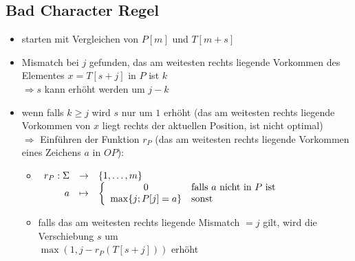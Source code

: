 \subsection{Bad Character Regel}
\vspace*{-0.5\baselineskip}\begin{itemize}[itemsep=-1pt]
	\item starten mit Vergleichen von $P[m]$ und $T[m+s]$
	\item Mismatch bei $j$ gefunden, das am weitesten rechts liegende Vorkommen des Elementes $x=T[s+j]$ in $P$ ist $k$\\
	$\Longrightarrow s$ kann erhöht werden um $j-k$
	\item wenn falls $k\geq j$ wird $s$ nur um $1$ erhöht (das am weitesten rechts liegende Vorkommen von $x$ liegt rechts der aktuellen Position, ist nicht optimal)\\
	$\Rightarrow$ Einführen der Funktion $r_P$ (das am weitesten rechts liegende Vorkommen eines Zeichens $a$ in $OP$):
		\begin{itemize}
			\item $\begin{array}[t]{rcl}
						r_P:\Sigma&\rightarrow&\{1,\dots,m\}\\
						a&\mapsto&\left\{\begin{array}{cl}
											0&\text{falls }a\text{ nicht in }P\text{ ist}\\
											\max\{j;P[j] = a\}& \text{sonst}
										\end{array}\right.
				\end{array}$
			\item falls das am weitesten rechts liegende Mismatch $=j$ gilt, wird die Verschiebung $s$ um\\
			$\max(1,j-r_P(T[s+j]))$ erhöht
		\end{itemize}
\end{itemize}